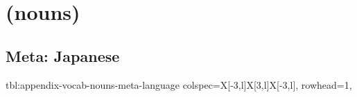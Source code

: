 \documentclass[../nihongo-gakushuu-kyouzai-vocabulary.tex]{subfiles}
\begin{document}
\appendix
\setcounter{section}{1}

\section{ (nouns)}


\subsection{Meta: Japanese}
{tbl:appendix-vocab-nouns-meta-language}  %
{}  %
{
    colspec={X[-3,l]X[3,l]X[-3,l]},
    rowhead=1,
}  %
\end{document}
